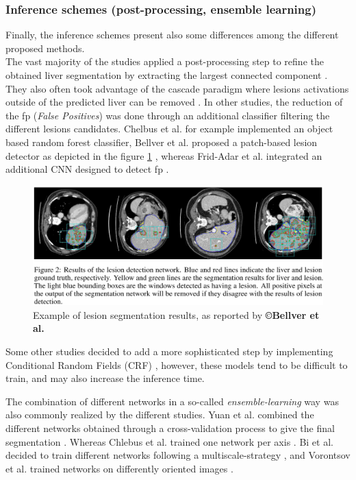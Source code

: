 \subsubsection{Inference schemes (post-processing, ensemble learning)}


Finally, the inference schemes present also some differences among the
different proposed methods. \\
The vast majority of the studies applied a post-processing step to
refine the obtained liver segmentation by extracting the largest
connected component \cite{Li2018, Han2017, Yuan2017, Bellver2017, Kaluva2018}. They
also often took advantage of the cascade paradigm where lesions
activations outside of the predicted liver can be removed \cite{Li2018, Yuan2017, Vorontsov2018}. In other studies, the reduction of the \ac{fp}
(\emph{False Positives}) was done through an additional classifier
filtering the different lesions candidates. Chelbus et al. \cite{Chlebus2018} for
example implemented an object based random forest classifier,
Bellver et al. proposed a patch-based lesion detector as
depicted in the figure \ref{Bellver_predResults} \cite{Bellver2017}, whereas Frid-Adar et al. integrated an
additional CNN designed to detect \ac{fp} \cite{Frid-adar2017}.

\begin{figure}[th!]
	\centering
	\includegraphics[width=0.7\linewidth]{images/image25}
	\caption{Example of lesion segmentation results, as reported by \textbf{©Bellver et al. \cite{Bellver2017}}}
	\label{Bellver_predResults}
\end{figure}


Some other studies decided to add a more sophisticated step by
implementing Conditional Random Fields (CRF) \cite{Christ2017, Rafiei2018, Dou2016}, however, these models
tend to be difficult to train, and may also
increase the inference time.

The combination of different networks in a so-called
\emph{ensemble-learning} way was also commonly realized by the different
studies. Yuan et al. combined the different networks obtained
through a cross-validation process to give the final segmentation \cite{Yuan2017}.
Whereas Chlebus et al. trained one network per axis \cite{Chlebus2018}. Bi et al. decided to train different networks following a
multiscale-strategy \cite{Bi2017}, and Vorontsov et al. trained networks on
differently oriented images \cite{Vorontsov2018}.

